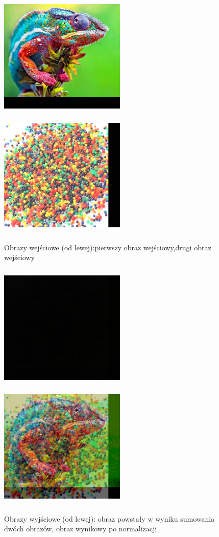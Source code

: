 \documentclass[magisterska,openany]{pracadypl}
\begin{document}
\newpage
\begin{figure}[h]
\centering
\includegraphics[width=6cm, height=6cm]{2_4/ResolRGB3.jpg}
\includegraphics[width=6cm, height=6cm]{2_4/ResolRGB4.jpg}
\caption{Obrazy wejściowe (od lewej):pierwszy obraz wejściowy,drugi obraz wejściowy}
\end{figure}
\begin{figure}[h]
\centering
\includegraphics[width=6cm, height=6cm]{4_2/add_twoRGB2.jpg}
\includegraphics[width=6cm, height=6cm]{4_2/nadd_twoRGB2.jpg}
\caption{Obrazy wyjściowe (od lewej): obraz powstały w wyniku sumowania dwóch obrazów, obraz wynikowy po normalizacji}
\end{figure}
\end{document}
